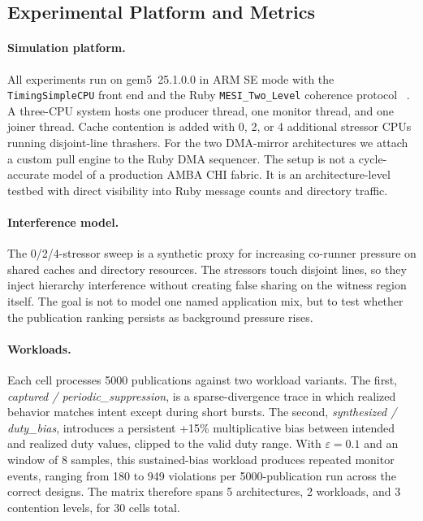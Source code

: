 \subsection{Experimental Platform and Metrics}
\label{sec:eval-method}

\paragraph{Simulation platform.}
All experiments run on gem5~25.1.0.0 in ARM SE mode with the
\texttt{TimingSimpleCPU} front end and the Ruby
\texttt{MESI\_Two\_Level} coherence protocol
~\cite{Binkert2011gem5,LowePower2020gem5,SorinHillWood2020Primer}. A
three-CPU system hosts one producer thread, one monitor thread, and one
joiner thread. Cache contention is added with 0, 2, or 4 additional
stressor CPUs running disjoint-line thrashers. For the two DMA-mirror
architectures we attach a custom pull engine to the Ruby DMA sequencer.
The setup is not a cycle-accurate model of a production AMBA CHI fabric.
It is an architecture-level testbed with direct visibility into Ruby
message counts and directory traffic.

\paragraph{Interference model.}
The 0/2/4-stressor sweep is a synthetic proxy for increasing co-runner
pressure on shared caches and directory resources. The stressors touch
disjoint lines, so they inject hierarchy interference without creating
false sharing on the witness region itself. The goal is not to model one
named application mix, but to test whether the publication ranking
persists as background pressure rises.

\paragraph{Workloads.}
Each cell processes 5000 publications against two workload variants. The
first, \emph{captured / periodic\_suppression}, is a sparse-divergence
trace in which realized behavior matches intent except during short
bursts. The second, \emph{synthesized / duty\_bias}, introduces a
persistent +15\% multiplicative bias between intended and realized duty
values, clipped to the valid duty range. With $\varepsilon=0.1$ and an
\STL window of 8 samples, this sustained-bias workload produces
repeated monitor events, ranging from 180 to 949 \STL violations per
5000-publication run across the correct designs. The matrix therefore
spans 5 architectures, 2 workloads, and 3 contention levels, for 30
cells total.


